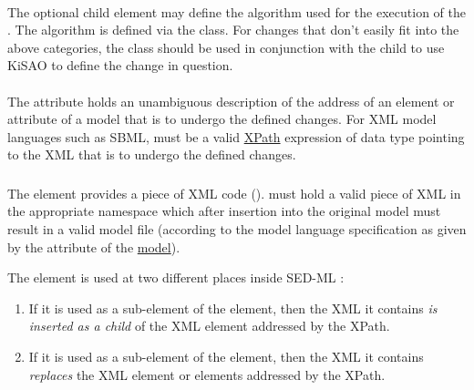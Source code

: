 \begin{blockChanged}
\paragraph*{}
\label{sec:change-algorithm}
The optional child  element may define the algorithm used for the execution of the \Change. The algorithm is defined via the \Algorithm class.  For changes that don't easily fit into the above categories, the \ComputeChange class should be used in conjunction with the child \Algorithm to use KiSAO to define the change in question.
\end{blockChanged}



\paragraph*{}
\label{sec:changeTarget}
The   attribute holds an unambiguous description of the address of an element or attribute of a model that is to undergo the defined changes. For XML model languages such as SBML, \hyperref[sec:changeTarget]{} must be a valid \hyperref[sec:xpath]{XPath} expression of data type \hyperref[type:xpath]{} pointing to the XML that is to undergo the defined changes.  


\subsubsection{}
\label{sec:newXml}
The  element provides a piece of XML code ().  must hold a valid piece of XML in the appropriate namespace which after insertion into the original model must result in a valid model file (according to the model language specification as given by the \hyperref[sec:language]{} attribute of the \hyperref[class:model]{model}).

The  element is used at two different places inside SED-ML \currentLV:

\begin{enumerate}
	\item{If it is used as a sub-element of the \hyperref[class:addXml]{} element, then the XML it contains \emph{is inserted as a child} of the XML element addressed by the XPath.}
	\item{If it is used as a sub-element of the \hyperref[class:changeXml]{} element, then the XML it contains \emph{replaces} the XML element or elements addressed by the XPath.}
\end{enumerate}

